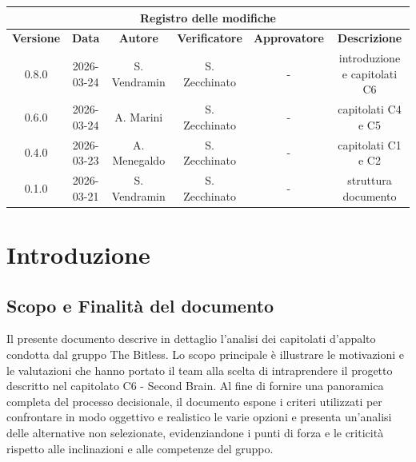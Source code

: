 \documentclass[a4paper, 10pt, colorlinks=true, linkcolor=black, urlcolor=blue, citecolor=blue, hidelinks]{article}
\begin{document}
\newcommand{\tipoverbale}{- Analisi dei Capitolati}
\newcommand{\dataverbale}{}
\newcommand{\dataversione}{\today}
\newcommand{\versione}{0.8.0}
\newcommand{\stato}{Stesura}
\newcommand{\destinatari}{The Bitless, prof. Tullio Vardanega, prof. Riccardo Cardin}

\begin{titlepage}

\end{titlepage}

\newpage
{}

\begin{center}
    \begin{tabular}{|c|c|c|c|c|c|}
        \hline
        \multicolumn{6}{|c|}{\textbf{Registro delle modifiche}} \\
        \hline
        \textbf{Versione} & \textbf{Data} & \textbf{Autore} & \textbf{Verificatore}& \textbf{Approvatore} & \textbf{Descrizione} \\
        \hline
          0.8.0  & 2026-03-24 & S. Vendramin  & S. Zecchinato & -& introduzione e capitolati C6 \\
        \hline
         0.6.0 & 2026-03-24 & A. Marini  & S. Zecchinato & -& capitolati C4 e C5 \\
        \hline
         0.4.0  & 2026-03-23 &  A. Menegaldo & S. Zecchinato & -& capitolati C1 e C2 \\
        \hline 
        0.1.0 & 2026-03-21 & S. Vendramin & S. Zecchinato & -   &  struttura documento \\
        \hline
       
    \end{tabular}
\end{center}

\newpage
\tableofcontents 

\newpage

\section{Introduzione}

\subsection{Scopo e Finalità del documento}
Il presente documento descrive in dettaglio l'analisi dei capitolati d'appalto condotta dal gruppo The Bitless. Lo scopo principale è illustrare le motivazioni e le valutazioni che hanno portato il team alla scelta di intraprendere il progetto descritto nel capitolato C6 - Second Brain. Al fine di fornire una panoramica completa del processo decisionale, il documento espone i criteri utilizzati per confrontare in modo oggettivo e realistico le varie opzioni e presenta un'analisi delle alternative non selezionate, evidenziandone i punti di forza e le criticità rispetto alle inclinazioni e alle competenze del gruppo.
\end{document}
